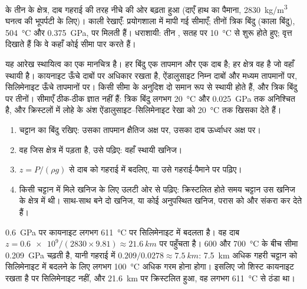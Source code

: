 \begin{omfigure}
{\small {} के तीन  के क्षेत्र, दाब गहराई की तरह
नीचे की ओर बढ़ता हुआ (दाएँ हाथ का पैमाना,
\qty{2830}{kg/m^3} घनत्व की भूपर्पटी के लिए)। काली रेखाएँ: प्रयोगशाला में मापी गई सीमाएँ;
तीनों त्रिक बिंदु (काला बिंदु), \qty{504}{\celsius} और
\qty{0.375}{GPa}, पर मिलती हैं। धराशायी: तीन , सतह पर
\qty{10}{\celsius} से शुरू होते हुए; वृत्त दिखाते हैं कि वे कहाँ कोई सीमा पार करते हैं।}
\end{omfigure}

यह आरेख स्थायित्व का एक मानचित्र है। हर बिंदु एक तापमान और एक
दाब है; हर क्षेत्र वह  है जो वहाँ स्थायी है। कायनाइट ऊँचे दाबों पर
अधिकार रखता है, ऐंडालुसाइट निम्न दाबों और मध्यम तापमानों पर,
सिलिमेनाइट ऊँचे तापमानों पर। किसी सीमा के अनुदिश दो 
समान रूप से स्थायी होते हैं, और त्रिक बिंदु पर तीनों। सीमाएँ ठीक-ठीक
ज्ञात नहीं हैं: त्रिक बिंदु लगभग \qty{20}{\celsius} और
\qty{0.025}{GPa} तक अनिश्चित है, और क्रिस्टलों में लोहे के अंश
ऐंडालुसाइट--सिलिमेनाइट रेखा को \qty{20}{\celsius} तक खिसका देते हैं।

\begin{method}[दाब--तापमान आरेख पढ़ना]\label{met:g12:metamorphic-rocks:pt}
\begin{enumerate}
  \item चट्टान का बिंदु रखिए: उसका तापमान क्षैतिज
        अक्ष पर, उसका दाब ऊर्ध्वाधर अक्ष पर।
  \item वह जिस क्षेत्र में पड़ता है, उसे पढ़िए: वहाँ स्थायी खनिज।
  \item $z = P/(\rho g)$ से दाब को गहराई में बदलिए, या उसे
        गहराई-पैमाने पर पढ़िए।
  \item किसी चट्टान में मिले खनिज के लिए उलटी ओर से पढ़िए: क्रिस्टलित होते समय
        चट्टान उस खनिज के क्षेत्र में थी। साथ-साथ बने दो खनिज,
        या कोई अनुपस्थित खनिज, परास को और संकरा कर देते हैं।
\end{enumerate}
\end{method}

\begin{example}[कायनाइट--सिलिमेनाइट सीमा]\label{ex:g12:metamorphic-rocks:kysil}
\qty{0.6}{GPa} पर कायनाइट लगभग
\qty{611}{\celsius} पर सिलिमेनाइट में बदलता है। वह दाब $z = \num{0.6e9} / (2830
\times 9.81) \approx \qty{21.6}{km}$ पर पहुँचता है। 600 और \qty{700}{\celsius} के बीच
सीमा \qty{0.209}{GPa} चढ़ती है, यानी गहराई में $0.209/0.0278 \approx
\qty{7.5}{km}$: \qty{7.5}{km} अधिक गहरी चट्टान को सिलिमेनाइट में बदलने के लिए
लगभग \qty{100}{\celsius} अधिक गरम होना होगा। इसलिए जो शिस्ट
कायनाइट रखता है पर सिलिमेनाइट नहीं, और \qty{21.6}{km} पर क्रिस्टलित हुआ, वह
लगभग \qty{611}{\celsius} से ठंडा था।
\end{example}

